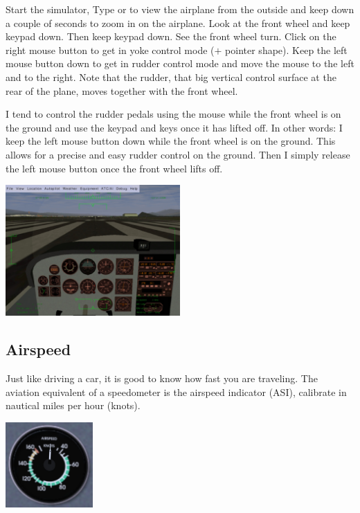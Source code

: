 Start the simulator, Type  or  to view the airplane from
the outside and keep  down a couple of seconds to zoom in on the
airplane. Look at the front wheel and keep keypad  down. Then
keep keypad  down. See the front wheel turn. Click on the
right mouse button to get in yoke control mode ($+$ pointer shape).
Keep the left mouse button down to get in rudder control mode and move
the mouse to the left and to the right. Note that the rudder, that big
vertical control surface at the rear of the plane, moves together with
the front wheel.

I tend to control the rudder pedals using the mouse while the front
wheel is on the ground and use the keypad  and 
keys once it has lifted off. In other words: I
keep the left mouse button down while the front wheel is on the
ground. This allows for a precise and easy rudder control on the
ground. Then I simply release the left mouse button once the front wheel 
lifts off. 

\begin{center}
\includegraphics[width=0.5\textwidth]{img/tut_23}
\end{center}

\subsection{Airspeed}

Just like driving a car, it is good to know how fast you are traveling.
The aviation equivalent of a speedometer is the airspeed indicator (ASI), 
calibrate in nautical miles per hour (knots).

\begin{center}
\includegraphics[width=0.25\textwidth]{img/tut_24}
\end{center}

